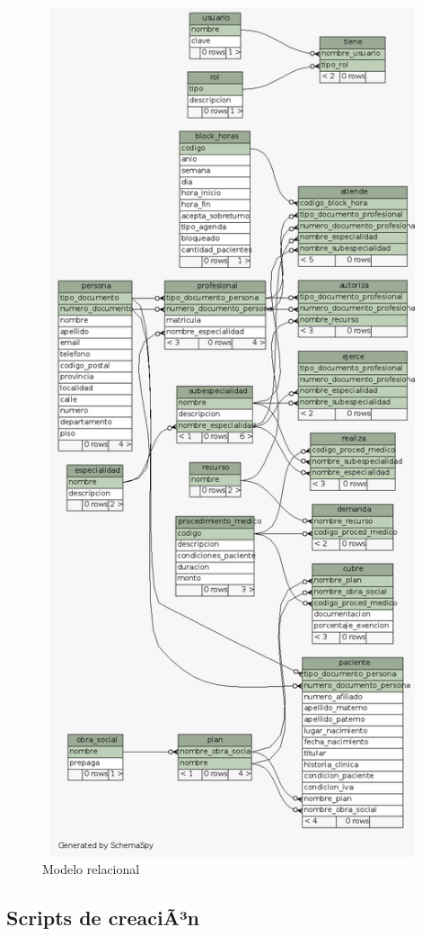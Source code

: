 \documentclass[a4paper,11pt]{article}
\begin{document}
\begin{figure}[h!t]
  \centering
  \includegraphics[width=15cm,height=25cm,angle=0]{build/images/relacional.png}
  \caption{Modelo relacional}
  \label{fig:relacional}
\end{figure}

\FloatBarrier

\subsection{\textbf{Scripts de creaciÃ³n}}
\end{document}
